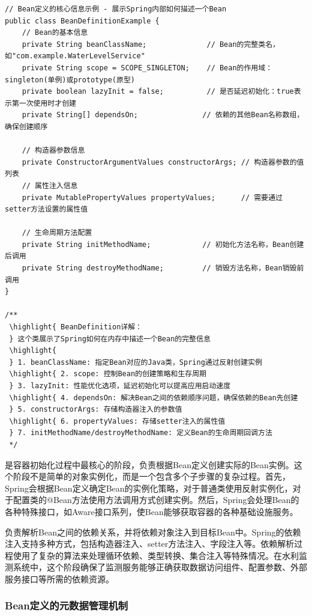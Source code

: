 \begin{lstlisting}[style=java]
// Bean定义的核心信息示例 - 展示Spring内部如何描述一个Bean
public class BeanDefinitionExample {
    // Bean的基本信息
    private String beanClassName;              // Bean的完整类名，如"com.example.WaterLevelService"
    private String scope = SCOPE_SINGLETON;    // Bean的作用域：singleton(单例)或prototype(原型)
    private boolean lazyInit = false;          // 是否延迟初始化：true表示第一次使用时才创建
    private String[] dependsOn;               // 依赖的其他Bean名称数组，确保创建顺序
    
    // 构造器参数信息
    private ConstructorArgumentValues constructorArgs; // 构造器参数的值列表
    // 属性注入信息  
    private MutablePropertyValues propertyValues;      // 需要通过setter方法设置的属性值
    
    // 生命周期方法配置
    private String initMethodName;            // 初始化方法名称，Bean创建后调用
    private String destroyMethodName;         // 销毁方法名称，Bean销毁前调用
}

/**
 \highlight{ BeanDefinition详解：
 } 这个类展示了Spring如何在内存中描述一个Bean的完整信息
 \highlight{ 
 } 1. beanClassName: 指定Bean对应的Java类，Spring通过反射创建实例
 \highlight{ 2. scope: 控制Bean的创建策略和生存周期
 } 3. lazyInit: 性能优化选项，延迟初始化可以提高应用启动速度
 \highlight{ 4. dependsOn: 解决Bean之间的依赖顺序问题，确保依赖的Bean先创建
 } 5. constructorArgs: 存储构造器注入的参数值
 \highlight{ 6. propertyValues: 存储setter注入的属性值
 } 7. initMethodName/destroyMethodName: 定义Bean的生命周期回调方法
 */
\end{lstlisting}

是容器初始化过程中最核心的阶段，负责根据Bean定义创建实际的Bean实例。这个阶段不是简单的对象实例化，而是一个包含多个子步骤的复杂过程。首先，Spring会根据Bean定义确定Bean的实例化策略，对于普通类使用反射实例化，对于配置类的@Bean方法使用方法调用方式创建实例。然后，Spring会处理Bean的各种特殊接口，如Aware接口系列，使Bean能够获取容器的各种基础设施服务。

负责解析Bean之间的依赖关系，并将依赖对象注入到目标Bean中。Spring的依赖注入支持多种方式，包括构造器注入、setter方法注入、字段注入等。依赖解析过程使用了复杂的算法来处理循环依赖、类型转换、集合注入等特殊情况。在水利监测系统中，这个阶段确保了监测服务能够正确获取数据访问组件、配置参数、外部服务接口等所需的依赖资源。

\hypertarget{beanux5b9aux4e49ux7684ux5143ux6570ux636eux7ba1ux7406ux673aux5236}{%
\subsubsection{Bean定义的元数据管理机制}\label{beanux5b9aux4e49ux7684ux5143ux6570ux636eux7ba1ux7406ux673aux5236}}

